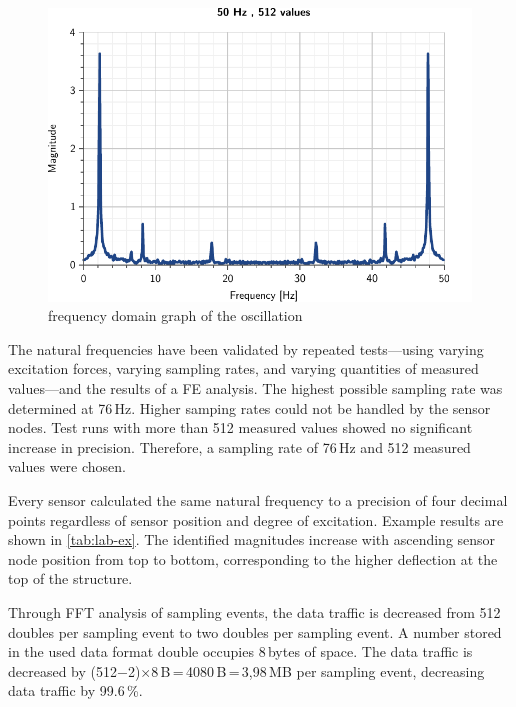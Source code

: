 \documentclass[12pt,a4paper]{scrartcl}
\begin{document}
\begin{figure}[htb]
    \centering
    \includegraphics[scale=0.9]{figures/50Hz.pdf}
    \caption{frequency domain graph of the oscillation}
    \label{fig:50hzfft}
\end{figure}

The natural frequencies have been validated by repeated tests---using varying excitation forces, varying sampling rates, and varying quantities of measured values---and the results of a FE analysis.
The highest possible sampling rate was determined at 76\,Hz.
Higher samping rates could not be handled by the sensor nodes.
Test runs with more than 512 measured values showed no significant increase in precision.
Therefore, a sampling rate of 76\,Hz and 512 measured values were chosen.

Every sensor calculated the same natural frequency to a precision of four decimal points regardless of sensor position and degree of excitation.
Example results are shown in \autoref{tab:lab-ex}.
The identified magnitudes increase with ascending sensor node position from top to bottom, corresponding to the higher deflection at the top of the structure.

Through FFT analysis of sampling events, the data traffic is decreased from 512 doubles per sampling event to two doubles per sampling event.
A number stored in the used data format double occupies 8\,bytes of space.
The data traffic is decreased by (512$-$2)$\times$8\,B\,=\,4080\,B\,=\,3,98\,MB per sampling event, decreasing data traffic by 99.6\,\%.
\end{document}
